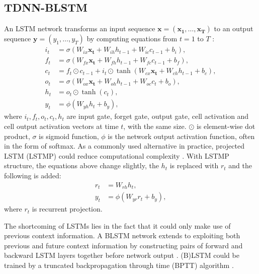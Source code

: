 \documentclass[a4paper]{article}
\begin{document}
\subsection{TDNN-BLSTM}
An LSTM network transforms an input sequence $\bm{x}=(\bm{x_1}, \ldots , \bm{x_T})$ to an output sequence $\bm{y}= (y_1, \ldots, y_T)$ by computing equations from $t=1$ to $T$ \cite{sak2014long}:
\begin{align}
i_t&=\sigma (W_{ix}\bm{x_t} + W_{ih}h_{t-1}+W_{ic}c_{t-1}+b_i),\\
f_t&=\sigma (W_{fx}\bm{x_t} + W_{fh}h_{t-1}+W_{fc}c_{t-1}+b_f), \\
c_t&=f_t \odot c_{t-1} + i_t \odot \tanh (W_{cx}\bm{x_t} + W_{ch}h_{t-1}+b_c),\\
o_t&=\sigma (W_{ox}\bm{x_t} + W_{oh}h_{t-1}+W_{oc}c_{t}+b_o), \\
h_t&= o_t \odot \tanh (c_t),\\
y_t&= \phi (W_{yh} h_t + b_y),
\end{align}
where $i_t, f_t, o_t, c_t, h_t$ are input gate, forget gate, output gate, cell activation and cell output activation vectors at time $t$, with the same size. $\odot$ is element-wise dot product, $\sigma$ is sigmoid function, $\phi$ is the network output activation function, often in the form of softmax. As a commonly used alternative in practice, projected LSTM (LSTMP) could reduce
computational complexity \cite{sak2014long}. With LSTMP structure, the equations above change slightly, the $h_t$ is replaced with $r_t$ and the following is added:
\begin{align}
r_t &= W_{rh}h_t, \\
y_t &= \phi (W_{yr}r_t + b_y),
\end{align}
where $r_t$ is recurrent projection.

The shortcoming of LSTMs lies in the fact that it could only make use of previous context information. A BLSTM network extends to exploiting both previous and future context information by constructing pairs of forward and backward LSTM layers together before network output \cite{graves2013hybrid}. (B)LSTM could be trained by a truncated backpropagation through time (BPTT) algorithm \cite{williams1990efficient}.
\end{document}
